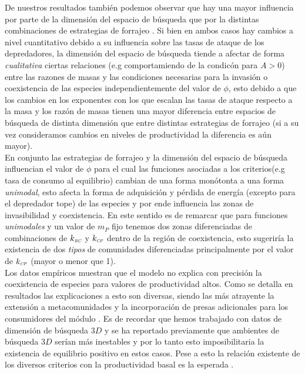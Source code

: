 De nuestros resultados tambi\'en podemos observar que hay una mayor influencia por parte de la dimensi\'on del espacio de b\'usqueda que por la distintas combinaciones de estrategias de forrajeo \citep{pawar2012dimensionality}. Si bien en ambos casos hay cambios a nivel cuantitativo debido a su influencia sobre las tasas de ataque de los depredadores, la dimensi\'on del espacio de b\'usqueda tiende a afectar de forma \emph{cualitativa} ciertas relaciones (e.g comportamiendo de la condic\'on para $A > 0$) entre las razones de masas y las condiciones necesarias para la invasi\'on o coexistencia de las especies independientemente del valor de $\phi$, esto debido a que los cambios en los exponentes con los que escalan las tasas de ataque respecto a la masa y los raz\'on de masas tienen una mayor diferencia entre espacios de b\'usqueda de distinta dimensi\'on que entre distintas estrategias de forrajeo (si a su vez consideramos cambios en niveles de productividad la diferencia es a\'un mayor). \\

En conjunto las estrategias de forrajeo y la dimensi\'on del espacio de b\'usqueda influencian el valor de $\phi$ para el cual las funciones asociadas a los criterios(e.g tasa de consumo al equilibrio) cambian de una forma mon\'otonta a una forma \emph{unimodal}, esto afecta la forma de adquisici\'on y p\'erdida de energ\'ia (excepto para el depredador tope) de las especies y por ende influencia las zonas de invasibilidad y coexistencia. En este sentido es de remarcar que para funciones \emph{unimodales} y un valor de $m_P$ fijo tenemos dos zonas diferenciadas de combinaciones de $k_{\textit{\tiny RC}}$ y $k_{\textit{\tiny CP}}$ dentro de la regi\'on de coexistencia, esto sugerir\'ia la existencia de dos \emph{tipos} de comunidades diferenciadas principalmente por el valor de $k_{\textit{\tiny CP}}$ (mayor o menor que 1). \\

Los datos emp\'iricos muestran que el modelo no explica con precisi\'on la coexistencia de especies para valores de productividad altos. Como se detalla en resultados las explicaciones a esto son diversas, siendo las m\'as atrayente la extensi\'on a metacomunidades\citep{Takimoto2012} y la incorporaci\'on de presas adicionales para los consumidores del m\'odulo \citep{holt2007alternative}. Es de recordar que hemos trabajado con datos de dimensi\'on de b\'usqueda $3D$ y se ha reportado previamente que ambientes de b\'usqueda $3D$ ser\'ian m\'as inestables \citep{pawar2012dimensionality} y por lo tanto esto imposibilitaria la existencia de equilibrio positivo en estos casos. Pese a esto la relaci\'on existente de los diversos criterios con la productividad basal es la esperada \citet{holt1997theoretical,diehl2000effects}.

